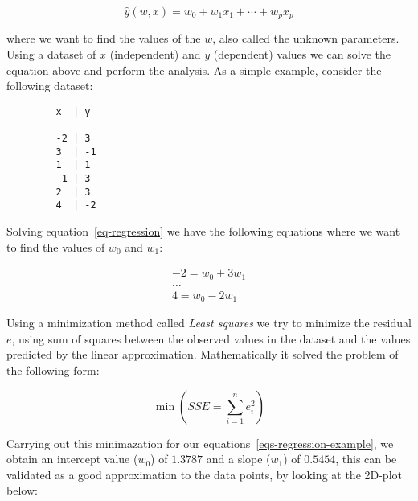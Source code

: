 \begin{equation}
  \label{eq-regression}
  \hat{y}(w,x) = w_0 + w_1 x_1 + \cdots + w_p x_p
\end{equation}

where we want to find the values of the $w$, also called the unknown
parameters. Using a dataset of $x$ (independent) and $y$ (dependent) values we
can solve the equation above and perform the analysis. As a simple example,
consider the following dataset:

\begin{figure}[H]
  \centering
  \begin{BVerbatim}
   x  | y
  --------
   -2 | 3
   3  | -1
   1  | 1
   -1 | 3
   2  | 3
   4  | -2
  \end{BVerbatim}
\end{figure}

Solving equation~\ref{eq-regression} we have the following equations where we
want to find the values of $w_0$ and $w_1$:

\begin{equation}
  \label{eqs-regression-example}
  \begin{split}
    -2 = w_0 + 3 w_1 \\
    \dots \\
    4 = w_0 - 2 w_1
  \end{split}
\end{equation}

Using a minimization method called \textit{Least squares} we try to minimize
the residual $e$, using sum of squares between the observed values in the
dataset and the values predicted by the linear approximation. Mathematically it
solved the problem of the following form:

\begin{equation}
  \min (SSE = \sum_{i=1}^{n} e_i^2)
\end{equation}

Carrying out this minimazation for our equations~\ref{eqs-regression-example},
we obtain an intercept value ($w_0$) of $1.3787$ and a slope ($w_1$) of
$0.5454$, this can be validated as a good approximation to the data points, by
looking at the 2D-plot below:

\begin{figure}[H]
  \centering
\end{figure}

